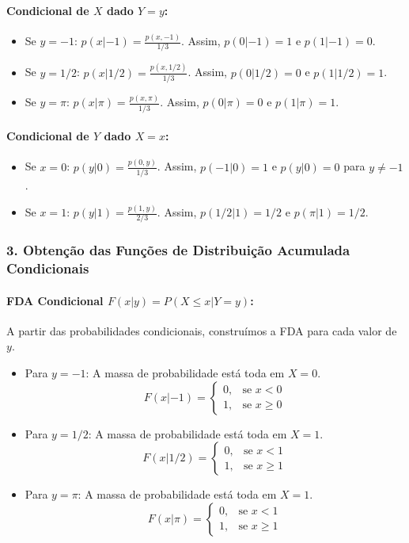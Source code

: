 \documentclass[
]{article}
\begin{document}
\paragraph{Condicional de $X$ dado $Y=y$:}
\begin{itemize}
    \item Se $y=-1$: $p(x|-1) = \frac{p(x,-1)}{1/3}$. Assim, $p(0|-1)=1$ e $p(1|-1)=0$.
    \item Se $y=1/2$: $p(x|1/2) = \frac{p(x,1/2)}{1/3}$. Assim, $p(0|1/2)=0$ e $p(1|1/2)=1$.
    \item Se $y=\pi$: $p(x|\pi) = \frac{p(x,\pi)}{1/3}$. Assim, $p(0|\pi)=0$ e $p(1|\pi)=1$.
\end{itemize}

\paragraph{Condicional de $Y$ dado $X=x$:}
\begin{itemize}
    \item Se $x=0$: $p(y|0) = \frac{p(0,y)}{1/3}$. Assim, $p(-1|0)=1$ e $p(y|0)=0$ para $y \neq -1$.
    \item Se $x=1$: $p(y|1) = \frac{p(1,y)}{2/3}$. Assim, $p(1/2|1)=1/2$ e $p(\pi|1)=1/2$.
\end{itemize}

\subsubsection*{3. Obtenção das Funções de Distribuição Acumulada Condicionais}

\paragraph{FDA Condicional $F(x|y) = P(X \le x | Y=y)$:}

A partir das probabilidades condicionais, construímos a FDA para cada
valor de \(y\).

\begin{itemize}
    \item Para $y=-1$: A massa de probabilidade está toda em $X=0$.
    $$ F(x|-1) = 
    \begin{cases}
        0, & \text{se } x < 0 \\
        1, & \text{se } x \ge 0
    \end{cases}
    $$
    \item Para $y=1/2$: A massa de probabilidade está toda em $X=1$.
    $$ F(x|1/2) = 
    \begin{cases}
        0, & \text{se } x < 1 \\
        1, & \text{se } x \ge 1
    \end{cases}
    $$
    \item Para $y=\pi$: A massa de probabilidade está toda em $X=1$.
    $$ F(x|\pi) = 
    \begin{cases}
        0, & \text{se } x < 1 \\
        1, & \text{se } x \ge 1
    \end{cases}
    $$
\end{itemize}
\end{document}
